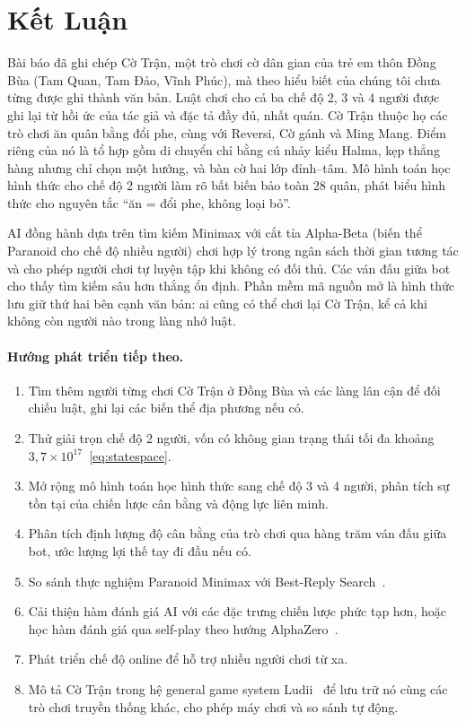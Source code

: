 \section{Kết Luận}
\label{sec:conclusion}

Bài báo đã ghi chép Cờ Trận, một trò chơi cờ dân gian của trẻ em thôn Đồng
Bùa (Tam Quan, Tam Đảo, Vĩnh Phúc), mà theo hiểu biết của chúng tôi chưa
từng được ghi thành văn bản. Luật chơi cho cả ba chế độ 2, 3 và 4 người
được ghi lại từ hồi ức của tác giả và đặc tả đầy đủ, nhất quán. Cờ Trận
thuộc họ các trò chơi ăn quân bằng đổi phe, cùng với Reversi, Cờ gánh và
Ming Mang. Điểm riêng của nó là tổ hợp gồm di chuyển chỉ bằng cú nhảy kiểu
Halma, kẹp thẳng hàng nhưng chỉ chọn một hướng, và bàn cờ hai lớp đỉnh--tâm.
Mô hình toán học hình thức cho chế độ 2 người làm rõ bất biến bảo toàn
28 quân, phát biểu hình thức cho nguyên tắc ``ăn = đổi phe, không loại bỏ''.

AI đồng hành dựa trên tìm kiếm Minimax với cắt tỉa Alpha-Beta (biến thể
Paranoid cho chế độ nhiều người) chơi hợp lý trong ngân sách thời gian
tương tác và cho phép người chơi tự luyện tập khi không có đối thủ. Các
ván đấu giữa bot cho thấy tìm kiếm sâu hơn thắng ổn định. Phần mềm mã nguồn
mở là hình thức lưu giữ thứ hai bên cạnh văn bản: ai cũng có thể chơi lại
Cờ Trận, kể cả khi không còn người nào trong làng nhớ luật.

\paragraph{Hướng phát triển tiếp theo.}
\begin{enumerate}[label=(\roman*)]
  \item Tìm thêm người từng chơi Cờ Trận ở Đồng Bùa và các làng lân cận để
        đối chiếu luật, ghi lại các biến thể địa phương nếu có.
  \item Thử giải trọn chế độ 2 người, vốn có không gian trạng thái tối đa
        khoảng $3{,}7\times10^{17}$~\eqref{eq:statespace}.
  \item Mở rộng mô hình toán học hình thức sang chế độ 3 và 4 người,
        phân tích sự tồn tại của chiến lược cân bằng và động lực
        liên minh.
  \item Phân tích định lượng độ cân bằng của trò chơi qua hàng trăm
        ván đấu giữa bot, ước lượng lợi thế tay đi đầu nếu có.
  \item So sánh thực nghiệm Paranoid Minimax với Best-Reply
        Search~\citep{schadd2011brs}.
  \item Cải thiện hàm đánh giá AI với các đặc trưng chiến lược phức
        tạp hơn, hoặc học hàm đánh giá qua self-play theo hướng
        AlphaZero~\citep{silver2018alphazero}.
  \item Phát triển chế độ online để hỗ trợ nhiều người chơi từ xa.
  \item Mô tả Cờ Trận trong hệ general game system Ludii~\citep{piette2020ludii}
        để lưu trữ nó cùng các trò chơi truyền thống khác, cho phép máy chơi
        và so sánh tự động.
\end{enumerate}
